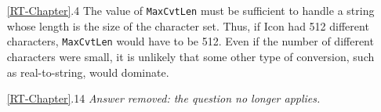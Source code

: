 \begin{itemize}
\goodbreak\item[\ref*{RT-Chapter}.4]
The value of \texttt{MaxCvtLen} must be sufficient to handle a string whose
length is the size of the character set. Thus, if Icon had 512 different characters,
\texttt{MaxCvtLen} would have to be 512. Even if the number of different
characters were small, it is unlikely that some other type of conversion,
such as real-to-string, would dominate.

\goodbreak\item[\ref*{RT-Chapter}.14]
{\em Answer removed: the question no longer applies.}

\end{itemize}
